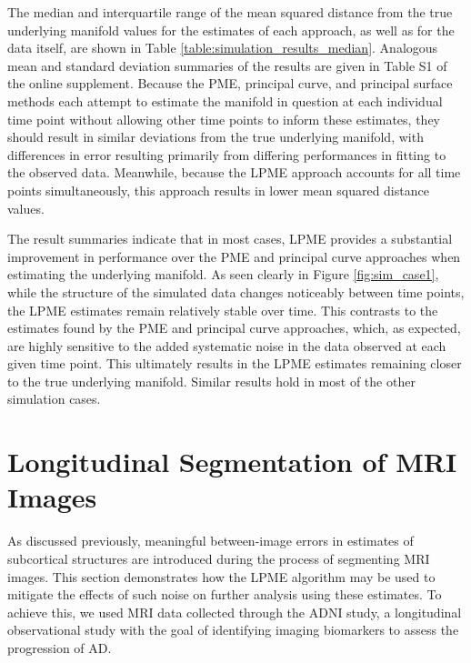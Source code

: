 \documentclass[12pt]{article}
\theoremstyle{definition}
\begin{document}
The median and interquartile range of the mean squared distance from the true underlying manifold values for the estimates of each approach, as well as for the data itself, are shown in Table \ref{table:simulation_results_median}. Analogous mean and standard deviation summaries of the results are given in Table S1 of the online supplement. Because the PME, principal curve, and principal surface methods each attempt to estimate the manifold in question at each individual time point without allowing other time points to inform these estimates, they should result in similar deviations from the true underlying manifold, with differences in error resulting primarily from differing performances in fitting to the observed data. Meanwhile, because the LPME approach accounts for all time points simultaneously, this approach results in lower mean squared distance values.

The result summaries indicate that in most cases, LPME provides a substantial improvement in performance over the PME and principal curve approaches when estimating the underlying manifold. As seen clearly in Figure \ref{fig:sim_case1}, while the structure of the simulated data changes noticeably between time points, the LPME estimates remain relatively stable over time. This contrasts to the estimates found by the PME and principal curve approaches, which, as expected, are highly sensitive to the added systematic noise in the data observed at each given time point. This ultimately results in the LPME estimates remaining closer to the true underlying manifold. Similar results hold in most of the other simulation cases.



\section{Longitudinal Segmentation of MRI Images}\label{s:application}

As discussed previously, meaningful between-image errors in estimates of subcortical structures are introduced during the process of segmenting MRI images. This section demonstrates how the LPME algorithm may be used to mitigate the effects of such noise on further analysis using these estimates. To achieve this, we used MRI data collected through the ADNI study, a longitudinal observational study with the goal of identifying imaging biomarkers to assess the progression of AD.
\end{document}
